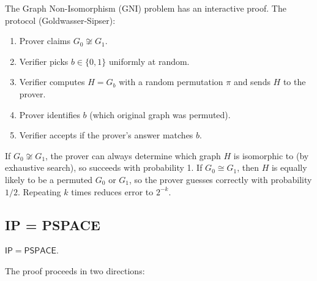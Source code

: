 \begin{theorem}
The Graph Non-Isomorphism (GNI) problem has an interactive proof. The protocol (Goldwasser-Sipser):
\begin{enumerate}
\item Prover claims $G_0 \not\cong G_1$.
\item Verifier picks $b \in \{0, 1\}$ uniformly at random.
\item Verifier computes $H = G_b$ with a random permutation $\pi$ and sends $H$ to the prover.
\item Prover identifies $b$ (which original graph was permuted).
\item Verifier accepts if the prover's answer matches $b$.
\end{enumerate}
If $G_0 \not\cong G_1$, the prover can always determine which graph $H$ is isomorphic to (by exhaustive search), so succeeds with probability 1. If $G_0 \cong G_1$, then $H$ is equally likely to be a permuted $G_0$ or $G_1$, so the prover guesses correctly with probability $1/2$. Repeating $k$ times reduces error to $2^{-k}$.
\end{theorem}

\subsection{IP = PSPACE}

\begin{theorem}[Shamir 1992]
$\mathsf{IP} = \mathsf{PSPACE}$.
\end{theorem}

The proof proceeds in two directions:

